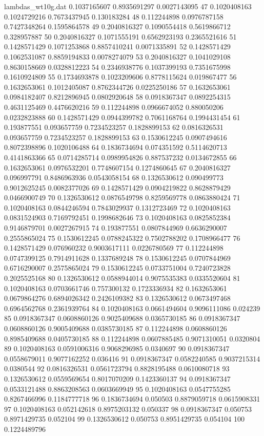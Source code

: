 \begin{filecontents*}{lambdas_wt10g.dat}
0.1037165607	0.8935691297	0.0027143095	47	0.1020408163
0.1024729216	0.7673437945	0.130183284	48	0.112244898
0.0976787158	0.7427348264	0.1595864578	49	0.2040816327
0.1090554418	0.5619866712	0.328957887	50	0.2040816327
0.1071555191	0.6562923193	0.2365521616	51	0.1428571429
0.1071253868	0.8857410241	0.0071335891	52	0.1428571429
0.1062531087	0.8859194833	0.0078274079	53	0.2040816327
0.1041029108	0.8630158669	0.0328812223	54	0.2346938776
0.1037399193	0.7351675998	0.1610924809	55	0.1734693878
0.1023209606	0.8778115624	0.019867477	56	0.1632653061
0.1012405087	0.8762344726	0.0225250186	57	0.1632653061
0.0984182407	0.8212896945	0.0802920648	58	0.0918367347
0.0892254315	0.4631125469	0.4476620216	59	0.112244898
0.0966674052	0.880050206	0.0232823888	60	0.1428571429
0.0944399782	0.7061168764	0.1994431454	61	0.193877551
0.093657759	0.7234523257	0.1828899153	62	0.0816326531
0.093657759	0.7234523257	0.1828899153	63	0.1530612245
0.0907494616	0.8072398896	0.1020106488	64	0.1836734694
0.074351592	0.5114620713	0.4141863366	65	0.0714285714
0.0989954826	0.887537232	0.0134672855	66	0.1632653061
0.0976532201	0.7748607154	0.1274860645	67	0.2040816327
0.096997791	0.8486963936	0.0543058154	68	0.1326530612
0.090499773	0.9012625245	0.0082377026	69	0.1428571429
0.0904219822	0.8628879429	0.0466900749	70	0.1326530612
0.0876549798	0.8259569778	0.0863880424	71	0.1020408163
0.0844246594	0.7843029937	0.1312723469	72	0.1020408163
0.0831524903	0.7169792451	0.1998682646	73	0.1020408163
0.0825852384	0.9146879701	0.0027267915	74	0.193877551
0.0807844969	0.6636290007	0.2555865024	75	0.1530612245
0.0788245322	0.7502788202	0.1708966477	76	0.1428571429
0.076960232	0.9003617111	0.0226780569	77	0.112244898
0.0747399125	0.7914911628	0.1337689248	78	0.1530612245
0.0707844969	0.6716290007	0.2575865024	79	0.1530612245
0.0733751004	0.7240723828	0.2025525168	80	0.1326530612
0.0588944014	0.9075535383	0.0335520604	81	0.1020408163
0.0703661746	0.757300132	0.1723336934	82	0.1632653061
0.0679864276	0.6894026342	0.2426109382	83	0.1326530612
0.0673497468	0.6964562768	0.2361939764	84	0.1020408163
0.0661494604	0.9096111086	0.024239	85	0.0918367347
0.0608860126	0.9025409688	0.0365730185	86	0.0918367347
0.0608860126	0.9005409688	0.0385730185	87	0.112244898
0.0608860126	0.8985409688	0.0405730185	88	0.112244898
0.0607885485	0.9071310051	0.0320804	89	0.1020408163
0.0591006316	0.9068296985	0.0340697	90	0.0918367347
0.0558679011	0.9077162252	0.036416	91	0.0918367347
0.0582240585	0.9037215314	0.0380544	92	0.0816326531
0.0561723794	0.8828195488	0.0610080718	93	0.1326530612
0.0559569654	0.8017070209	0.1423360137	94	0.0918367347
0.0533121488	0.8863208563	0.0603669949	95	0.1020408163
0.0547755285	0.8267466996	0.1184777718	96	0.1836734694
0.050503	0.8879059718	0.0615908331	97	0.1020408163
0.052142618	0.8975203132	0.050337	98	0.0918367347
0.050753	0.8971429735	0.052104	99	0.1326530612
0.050753	0.8951429735	0.054104	100	0.1224489796
\end{filecontents*}
%
%


